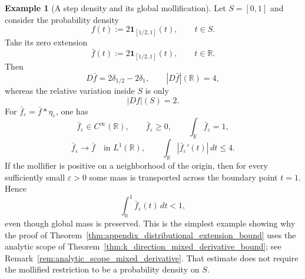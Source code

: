 \documentclass[11pt,letterpaper]{article}
\theoremstyle{definition}
\newtheorem{example}[theorem]{Example}
\theoremstyle{remark}
\begin{document}
\begin{example}[A step density and its global mollification]
\label{ex:appendix_step_density_mollification}
Let $S=[0,1]$ and consider the probability density
$$
f(t):=2\mathbf 1_{[1/2,1]}(t),
\qquad t\in S.
$$
Take its zero extension
$$
\bar f(t):=2\mathbf 1_{[1/2,1]}(t),
\qquad t\in\mathbb R.
$$
Then
$$
D\bar f=2\delta_{1/2}-2\delta_1,
\qquad
|D\bar f|(\mathbb R)=4,
$$
whereas the relative variation inside $S$ is only
$$
|Df|(S)=2.
$$
For $\bar f_\varepsilon=\bar f*\eta_\varepsilon$, one has
$$
\bar f_\varepsilon\in C^\infty(\mathbb R),
\qquad
\bar f_\varepsilon\ge0,
\qquad
\int_{\mathbb R}\bar f_\varepsilon=1,
$$
$$
\bar f_\varepsilon\to\bar f
\quad\text{in }L^1(\mathbb R),
\qquad
\int_{\mathbb R}|\bar f_\varepsilon'(t)|\,dt\le4.
$$
If the mollifier is positive on a neighborhood of the origin, then for every
sufficiently small $\varepsilon>0$ some mass is transported across the boundary
point $t=1$. Hence
$$
\int_0^1\bar f_\varepsilon(t)\,dt<1,
$$
even though global mass is preserved. This is the simplest example showing why
the proof of Theorem~\ref{thm:appendix_distributional_extension_bound} uses
the analytic scope of
Theorem~\ref{thm:k_direction_mixed_derivative_bound}; see
Remark~\ref{rem:analytic_scope_mixed_derivative}. That estimate does not
require the mollified restriction to be a probability density on $S$.
\end{example}
\end{document}
